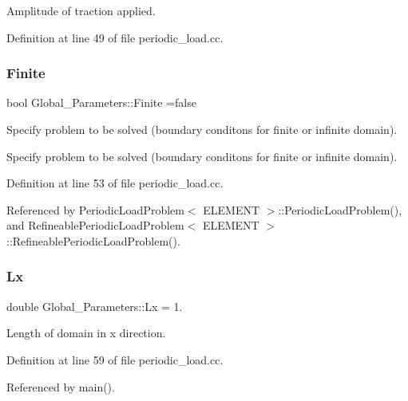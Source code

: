 Amplitude of traction applied. 



Definition at line 49 of file periodic\+\_\+load.\+cc.

\mbox{\label{namespaceGlobal__Parameters_a3a5d4759509036a2650d5efde8e15d56}} 
\subsubsection{\texorpdfstring{Finite}{Finite}}
{\footnotesize\ttfamily bool Global\+\_\+\+Parameters\+::\+Finite =false}



Specify problem to be solved (boundary conditons for finite or infinite domain). 

Specify problem to be solved (boundary conditons for finite or infinite domain). 

Definition at line 53 of file periodic\+\_\+load.\+cc.



Referenced by Periodic\+Load\+Problem$<$ E\+L\+E\+M\+E\+N\+T $>$\+::\+Periodic\+Load\+Problem(), and Refineable\+Periodic\+Load\+Problem$<$ E\+L\+E\+M\+E\+N\+T $>$\+::\+Refineable\+Periodic\+Load\+Problem().

\mbox{\label{namespaceGlobal__Parameters_a8a81b077f0a29b3468c576f56ecb1348}} 
\subsubsection{\texorpdfstring{Lx}{Lx}}
{\footnotesize\ttfamily double Global\+\_\+\+Parameters\+::\+Lx = 1.}



Length of domain in x direction. 



Definition at line 59 of file periodic\+\_\+load.\+cc.



Referenced by main().

\mbox{\label{namespaceGlobal__Parameters_a25a31b2de3f05ac457b62fc9fa999872}} 
